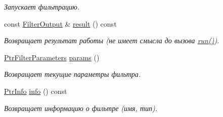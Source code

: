 \begin{DoxyCompactItemize}
\begin{DoxyCompactList}\small\item\em Запускает фильтрацию. \end{DoxyCompactList}\item 
\hypertarget{class_core_1_1_filter_a40f9629b2d882f9b49745f97d98d1dd0}{}\label{class_core_1_1_filter_a40f9629b2d882f9b49745f97d98d1dd0} 
const \hyperlink{namespace_core_a60877581a235fc9566087b54d463ce9c}{Filter\+Output} \& \hyperlink{class_core_1_1_filter_a40f9629b2d882f9b49745f97d98d1dd0}{result} () const
\begin{DoxyCompactList}\small\item\em Возвращает результат работы (не имеет смысла до вызова \hyperlink{class_core_1_1_filter_ad5070e695763edc66d211651b98c09f1}{run()}). \end{DoxyCompactList}\item 
\hypertarget{class_core_1_1_filter_a44aa749b49ba46256975ce545531ecf7}{}\label{class_core_1_1_filter_a44aa749b49ba46256975ce545531ecf7} 
\hyperlink{namespace_core_a4811af8148ba137d644b9a61a042cf03}{Ptr\+Filter\+Parameters} \hyperlink{class_core_1_1_filter_a44aa749b49ba46256975ce545531ecf7}{params} ()
\begin{DoxyCompactList}\small\item\em Возвращает текущие параметры фильтра. \end{DoxyCompactList}\item 
\hypertarget{class_core_1_1_filter_a714dcb3d548dd7f0e3728f29990ff5a3}{}\label{class_core_1_1_filter_a714dcb3d548dd7f0e3728f29990ff5a3} 
\hyperlink{namespace_core_a647483da8a1266d5bbd3e9bb5cd66d08}{Ptr\+Info} \hyperlink{class_core_1_1_filter_a714dcb3d548dd7f0e3728f29990ff5a3}{info} () const
\begin{DoxyCompactList}\small\item\em Возвращает информацию о фильтре (имя, тип). \end{DoxyCompactList}\end{DoxyCompactItemize}
